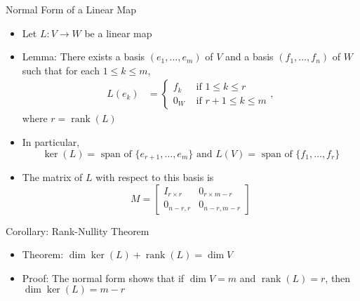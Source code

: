 \documentclass[usenames,dvipsnames,10pt]{beamer}
\newcommand\rank{\operatorname{rank}}
\begin{document}
\begin{frame}
  {Normal Form of a Linear Map}

  \begin{itemize}
  \item Let $L: V \rightarrow W$ be a linear map
  \item Lemma: There exists a basis $(e_1, \dots, e_m)$ of $V$ and a basis $(f_1, \dots, f_n)$ of $W$ such that for each $1 \le k \le m$,
    \begin{align*}
      L(e_k)
      &=
        \begin{cases}
          f_k &\text{ if }1 \le k \le r\\
          0_W &\text{ if }r+1 \le k \le m
        \end{cases},
    \end{align*}
    where $r = \rank(L)$
  \item In particular,
    \[ \ker(L) = \text{ span of }\{e_{r+1}, \dots, e_m \} \text{ and }L(V) = \text{ span of }\{f_1, \dots, f_r\} \]
  \item The matrix of $L$ with respect to this basis is
    \[
      M = \left[\begin{array}{c|c} I_{r\times r} & 0_{r\times m-r} \\ \hline 0_{n-r,r} & 0_{n-r,m-r} \end{array}\right]
    \]
  \end{itemize}
\end{frame}

\begin{frame}
  {Corollary: Rank-Nullity Theorem}

  \begin{itemize}
  \item Theorem: $\dim \ker(L) + \rank(L) = \dim V$
  \item Proof: The normal form shows that if $\dim V = m$ and $\rank(L) = r$, then $\dim \ker(L) = m-r$
  \end{itemize}
\end{frame}
\end{document}
